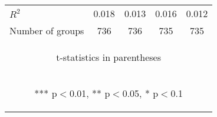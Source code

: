 \documentclass[]{article}
\begin{document}
\begin{center}
\begin{tabular}{lcccc}
        $R^2$            & 0.018                                           & 0.013                                          & 0.016                                          & 0.012                                          \\
        Number of groups & 736                                             & 736                                            & 735                                            & 735                                            \\ \hline
        \multicolumn{5}{c}{\begin{footnotesize} t-statistics in parentheses\end{footnotesize}}                                                                                                                                \\
        \multicolumn{5}{c}{\begin{footnotesize} *** p$<$0.01, ** p$<$0.05, * p$<$0.1\end{footnotesize}}                                                                                                                       \\
    \end{tabular}
\end{center}
\end{document}
